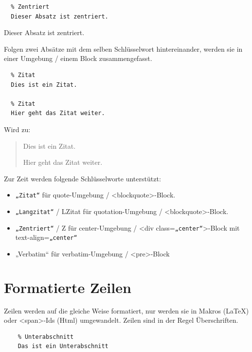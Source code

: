 \documentclass{scrartcl}
\begin{document}
\begin{verbatim}
  % Zentriert
  Dieser Absatz ist zentriert.
\end{verbatim}


\begin{center}
Dieser Absatz ist zentriert.
\end{center}


{Folgen zwei Absätze mit dem selben Schlüsselwort
hintereinander, werden sie in einer Umgebung / einem Block
zusammengefasst.\\}

\begin{verbatim}
  % Zitat
  Dies ist ein Zitat.

  % Zitat
  Hier geht das Zitat weiter.
\end{verbatim}


{Wird zu:\\}

\colorbox{gray!75}{\parbox{\linewidth}{%
\begin{quote}
\centering%
Dies ist ein Zitat.

Hier geht das Zitat weiter.
\end{quote}

}
}

{Zur Zeit werden folgende Schlüsselworte unterstützt:\\}

\begin{itemize}
\item \texttt{„Zitat“} für quote-Umgebung / <blockquote>-Block.
\item \texttt{„Langzitat“} / LZitat für quotation-Umgebung / <blockquote>-Block.
\item \texttt{„Zentriert“} / Z für center-Umgebung / <div class=\texttt{„center“}>-Block mit text-align=\texttt{„center“}
\item „Verbatim“ für verbatim-Umgebung / <pre>-Block
\end{itemize}


\section{Formatierte Zeilen}

{Zeilen werden auf die gleiche Weise formatiert, nur werden sie in Makros (LaTeX) oder <span>-Ids (Html) umgewandelt. Zeilen sind in der Regel Überschriften.\\}

\begin{verbatim}
    % Unterabschnitt
    Das ist ein Unterabschnitt
\end{verbatim}
\end{document}
